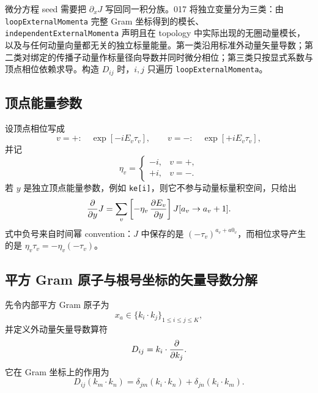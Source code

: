 ﻿\documentclass[a4paper,11pt]{article}
\begin{document}
微分方程 seed 需要把 $\partial_x J$ 写回同一积分族。017 将独立变量分为三类：由 \texttt{loopExternalMomenta} 完整 Gram 坐标得到的模长、\texttt{independentExternalMomenta} 声明且在 topology 中实际出现的无圈动量模长，以及与任何动量向量都无关的独立标量能量。第一类沿用标准外动量矢量导数；第二类对绑定的传播子动量作标量径向导数并同时微分相位；第三类只按显式系数与顶点相位依赖求导。构造 $D_{ij}$ 时，$i,j$ 只遍历 \texttt{loopExternalMomenta}。

\subsection{顶点能量参数}

设顶点相位写成
\begin{equation}
  v=+:\quad \exp[-iE_v\tau_v],
  \qquad
  v=-:\quad \exp[+iE_v\tau_v],
\end{equation}
并记
\begin{equation}
  \eta_v=
  \begin{cases}
  -i,& v=+,\\
  +i,& v=-.
  \end{cases}
\end{equation}
若 $y$ 是独立顶点能量参数，例如 \verb|ke[i]|，则它不参与动量标量积空间，只给出
\begin{equation}
  {\partial\over\partial y}J
  =
  \sum_v
  \left[-\eta_v\,{\partial E_v\over\partial y}\right]
  J[a_v\to a_v+1].
  \label{vertexEnergyDerivative}
\end{equation}
式中负号来自时间幂 convention：$J$ 中保存的是 $(-\tau_v)^{a_v+a0_v}$，而相位求导产生的是 $\eta_v\tau_v=-\eta_v(-\tau_v)$。

\subsection{平方 Gram 原子与根号坐标的矢量导数分解}

先令内部平方 Gram 原子为
\begin{equation}
  x_a\in\{k_i\cdot k_j\}_{1\le i\le j\le K},
\end{equation}
并定义外动量矢量导数算符
\begin{equation}
  D_{ij}=k_i\cdot{\partial\over\partial k_j}.
\end{equation}
它在 Gram 坐标上的作用为
\begin{equation}
  D_{ij}(k_m\cdot k_n)
  =
  \delta_{jm}(k_i\cdot k_n)
  +
  \delta_{jn}(k_i\cdot k_m).
  \label{externalVectorGramAction}
\end{equation}
\end{document}
